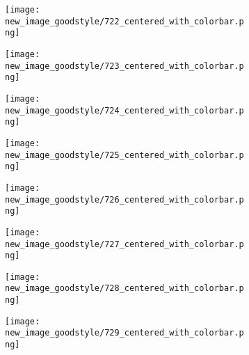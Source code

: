 \documentclass[a4paper,12pt]{article}
\begin{document}
\begin{figure}[H]
  \begin{subfigure}{0.11\textwidth}
    \texttt{[image: new\_image\_goodstyle/722\_centered\_with\_colorbar.png]}
  \end{subfigure}
  \hfill
  \begin{subfigure}{0.11\textwidth}
    \texttt{[image: new\_image\_goodstyle/723\_centered\_with\_colorbar.png]}
  \end{subfigure}
  \hfill
  \begin{subfigure}{0.11\textwidth}
    \texttt{[image: new\_image\_goodstyle/724\_centered\_with\_colorbar.png]}
  \end{subfigure}
  \hfill
  \begin{subfigure}{0.11\textwidth}
    \texttt{[image: new\_image\_goodstyle/725\_centered\_with\_colorbar.png]}
  \end{subfigure}
  \hfill
  \begin{subfigure}{0.11\textwidth}
    \texttt{[image: new\_image\_goodstyle/726\_centered\_with\_colorbar.png]}
  \end{subfigure}
  \hfill
  \begin{subfigure}{0.11\textwidth}
    \texttt{[image: new\_image\_goodstyle/727\_centered\_with\_colorbar.png]}
  \end{subfigure}
  \hfill
  \begin{subfigure}{0.11\textwidth}
    \texttt{[image: new\_image\_goodstyle/728\_centered\_with\_colorbar.png]}
  \end{subfigure}
  \hfill
  \begin{subfigure}{0.11\textwidth}
    \texttt{[image: new\_image\_goodstyle/729\_centered\_with\_colorbar.png]}
  \end{subfigure}
  \hfill
\end{figure}
\end{document}
